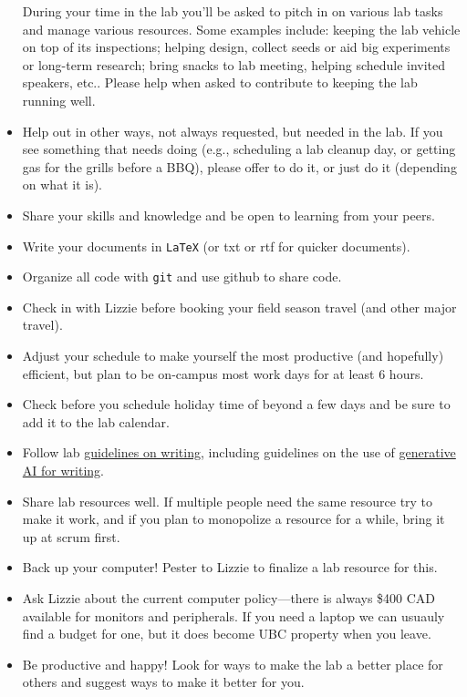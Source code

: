 \documentclass[11pt,a4paper,oneside]{article}
\begin{document}
\begin{itemize}
During your time in the lab you'll be asked to pitch in on various lab tasks and manage various resources. Some examples include: keeping the lab vehicle on top of its inspections; helping design, collect seeds or aid big experiments or long-term research; bring snacks to lab meeting, helping schedule invited speakers, etc.. Please help when asked to contribute to keeping the lab running well. 
\item Help out in other ways, not always requested, but needed in the lab. If you see something that needs doing (e.g., scheduling a lab cleanup day, or getting gas for the grills before a BBQ), please offer to do it, or just do it (depending on what it is). 
\item Share your skills and knowledge and be open to learning from your peers. 
\item Write your documents in \verb|LaTeX| (or txt or rtf for quicker documents).
\item Organize all code with \verb|git| and use github to share code.
\item Check in with Lizzie before booking your field season travel (and other major travel). 
\item Adjust your schedule to make yourself the most productive (and hopefully) efficient, but plan to be on-campus most work days for at least 6 hours.
\item Check before you schedule holiday time of beyond a few days and be sure to add it to the lab calendar.
\item Follow lab \href{https://github.com/temporalecologylab/labgit/blob/master/expectations/writing/tempeco_writing.pdf}{guidelines on writing}, including guidelines on the use of \href{https://github.com/temporalecologylab/labgit/blob/master/expectations/writing/genAI_labguidelines.pdf}{generative AI for writing}.
\item Share lab resources well. If multiple people need the same resource try to make it work, and if you plan to monopolize a resource for a while, bring it up at scrum first. 
\item Back up your computer! Pester to Lizzie to finalize a lab resource for this.
\item Ask Lizzie about the current computer policy---there is always \$400 CAD available for monitors and peripherals. If you need a laptop we can usuauly find a budget for one, but it does become UBC property when you leave. 
\item Be productive and happy! Look for ways to make the lab a better place for others and suggest ways to make it better for you. 
\end{itemize}

% 
\end{document}
